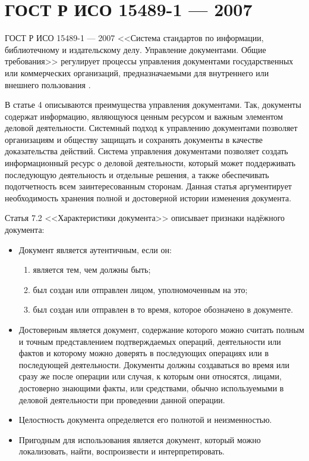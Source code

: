 \section{ГОСТ Р ИСО 15489-1 --- 2007} \label{rights_gost_15489_1}

ГОСТ Р ИСО 15489-1 --- 2007 <<Система стандартов по информации, библиотечному и издательскому делу. Управление документами. Общие требования>> регулирует процессы управления документами государственных или коммерческих организаций, предназначаемыми для внутреннего или внешнего пользования \cite{gost15489}.

В статье 4 описываются преимущества управления документами. Так, документы содержат информацию, являющуюся ценным ресурсом и важным элементом деловой деятельности. Системный подход к управлению документами позволяет организациям и обществу защищать и сохранять документы в качестве доказательства действий. Система управления документами позволяет создать информационный ресурс о деловой деятельности, который может поддерживать последующую деятельность и отдельные решения, а также обеспечивать подотчетность всем заинтересованным сторонам. Данная статья аргументирует необходимость хранения полной и достоверной истории изменения документа.

Статья 7.2 <<Характеристики документа>> описывает признаки надёжного документа:
\begin{itemize}
	\item Документ является аутентичным, если он:
	\begin{enumerate}
	\item является тем, чем должны быть;
	\item был создан или отправлен лицом, уполномоченным на это;
	\item был создан или отправлен в то время, которое обозначено в документе.
	\end{enumerate}
	\item Достоверным является документ, содержание которого можно считать полным и точным представлением подтверждаемых операций, деятельности или фактов и которому можно доверять в последующих операциях или в последующей деятельности. Документы должны создаваться во время или сразу же после операции или случая, к которым они относятся, лицами, достоверно знающими факты, или средствами, обычно используемыми в деловой деятельности при проведении данной операции.
	\item Целостность документа определяется его полнотой и неизменностью.
	\item Пригодным для использования является документ, который можно локализовать, найти, воспроизвести и интерпретировать.
\end{itemize}